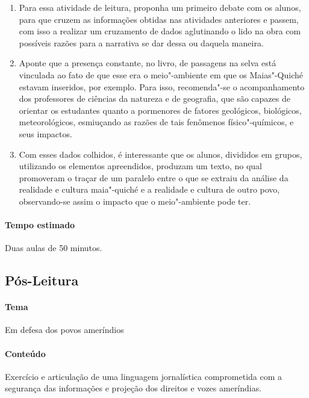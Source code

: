 \documentclass[12pt]{extarticle}
\begin{document}
\begin{enumerate}
\item
Para essa atividade de leitura, proponha um primeiro debate com os alunos, 
para que cruzem as informações obtidas nas atividades anteriores e passem, 
com isso a realizar um cruzamento de dados aglutinando o lido na obra
com possíveis razões para a narrativa se dar dessa ou daquela maneira.

\item
Aponte que a presença constante, no livro, de passagens na selva está vinculada ao fato de que esse era 
o meio"-ambiente em que os Maias"-Quiché estavam inseridos, por exemplo.
Para isso, recomenda"-se o acompanhamento dos professores de ciências da
natureza e de geografia, que são capazes de orientar os estudantes
quanto a pormenores de fatores geológicos, biológicos, meteorológicos,
esmiuçando as razões de tais fenômenos físico"-químicos, e seus impactos.

\item
Com esses dados colhidos, é interessante que os alunos, divididos em
grupos, utilizando os elementos apreendidos, produzam um texto, no qual
promoveram o traçar de um paralelo entre o que se extraiu da análise da
realidade e cultura maia"-quiché e a realidade e cultura de outro povo,
observando-se assim o impacto que o meio"-ambiente pode ter.

\end{enumerate}

\paragraph{Tempo estimado} Duas aulas de 50 minutos. 

\subsection{Pós-Leitura}

\paragraph{Tema} Em defesa dos povos ameríndios

\paragraph{Conteúdo}  Exercício e articulação de uma linguagem jornalística
comprometida com a segurança das informações e projeção dos direitos e vozes
ameríndias. 
\end{document}
